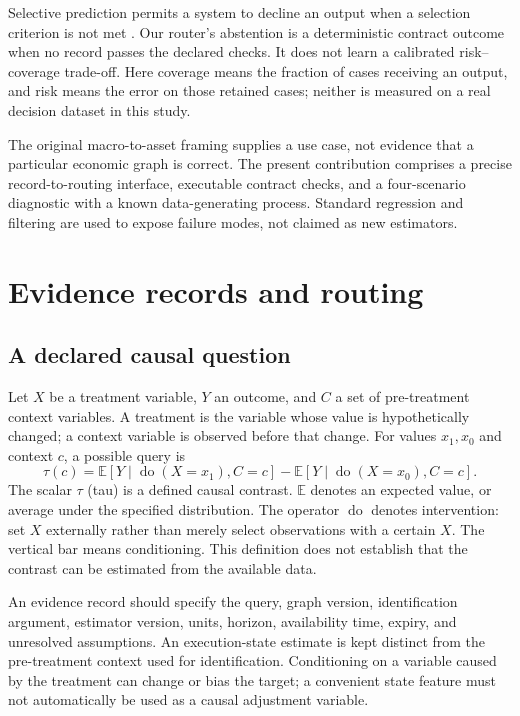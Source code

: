 Selective prediction permits a system to decline an output when a selection criterion is not met \citep{geifman2019selectivenet}. Our router's abstention is a deterministic contract outcome when no record passes the declared checks. It does not learn a calibrated risk--coverage trade-off. Here coverage means the fraction of cases receiving an output, and risk means the error on those retained cases; neither is measured on a real decision dataset in this study.

The original macro-to-asset framing supplies a use case, not evidence that a particular economic graph is correct. The present contribution comprises a precise record-to-routing interface, executable contract checks, and a four-scenario diagnostic with a known data-generating process. Standard regression and filtering are used to expose failure modes, not claimed as new estimators.

\section{Evidence records and routing}
\subsection{A declared causal question}
Let $X$ be a treatment variable, $Y$ an outcome, and $C$ a set of pre-treatment context variables. A treatment is the variable whose value is hypothetically changed; a context variable is observed before that change. For values $x_1,x_0$ and context $c$, a possible query is
\begin{equation}
 \tau(c)=\mathbb{E}[Y\mid\operatorname{do}(X=x_1),C=c]
 -\mathbb{E}[Y\mid\operatorname{do}(X=x_0),C=c].
\end{equation}
The scalar $\tau$ (tau) is a defined causal contrast. $\mathbb{E}$ denotes an expected value, or average under the specified distribution. The operator $\operatorname{do}$ denotes intervention: set $X$ externally rather than merely select observations with a certain $X$. The vertical bar means conditioning. This definition does not establish that the contrast can be estimated from the available data.

An evidence record should specify the query, graph version, identification argument, estimator version, units, horizon, availability time, expiry, and unresolved assumptions. An execution-state estimate is kept distinct from the pre-treatment context used for identification. Conditioning on a variable caused by the treatment can change or bias the target; a convenient state feature must not automatically be used as a causal adjustment variable.

